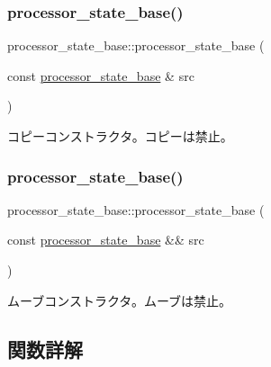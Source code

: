 \subsubsection{\texorpdfstring{processor\+\_\+state\+\_\+base()}{processor\_state\_base()}\hspace{0.1cm}{\footnotesize\ttfamily [2/3]}}
{\footnotesize\ttfamily processor\+\_\+state\+\_\+base\+::processor\+\_\+state\+\_\+base (\begin{DoxyParamCaption}\item[{const \hyperlink{classprocessor__state__base}{processor\+\_\+state\+\_\+base} \&}]{src }\end{DoxyParamCaption})\hspace{0.3cm}{\ttfamily [delete]}}

コピーコンストラクタ。コピーは禁止。 \hypertarget{classprocessor__state__base_a279491bbdf2128e13415e12b998fdc2e}{}\label{classprocessor__state__base_a279491bbdf2128e13415e12b998fdc2e} 
\subsubsection{\texorpdfstring{processor\+\_\+state\+\_\+base()}{processor\_state\_base()}\hspace{0.1cm}{\footnotesize\ttfamily [3/3]}}
{\footnotesize\ttfamily processor\+\_\+state\+\_\+base\+::processor\+\_\+state\+\_\+base (\begin{DoxyParamCaption}\item[{const \hyperlink{classprocessor__state__base}{processor\+\_\+state\+\_\+base} \&\&}]{src }\end{DoxyParamCaption})\hspace{0.3cm}{\ttfamily [delete]}}

ムーブコンストラクタ。ムーブは禁止。 

\subsection{関数詳解}
\hypertarget{classprocessor__state__base_a93975feff3d07c035f39cf756c59c5c9}{}\label{classprocessor__state__base_a93975feff3d07c035f39cf756c59c5c9} 
